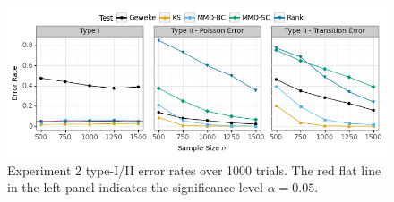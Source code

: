 \documentclass{article}
\begin{document}

\begin{figure}
    \centering
    \includegraphics[width=\textwidth]{figures/results_2.png}
    \caption{Experiment 2 type-I/II error rates over 1000 trials. 
    The red flat line in the left panel indicates the significance level $\alpha=0.05$. 
    }
    \label{fig:ex2_comparison}
\end{figure}
\end{document}
